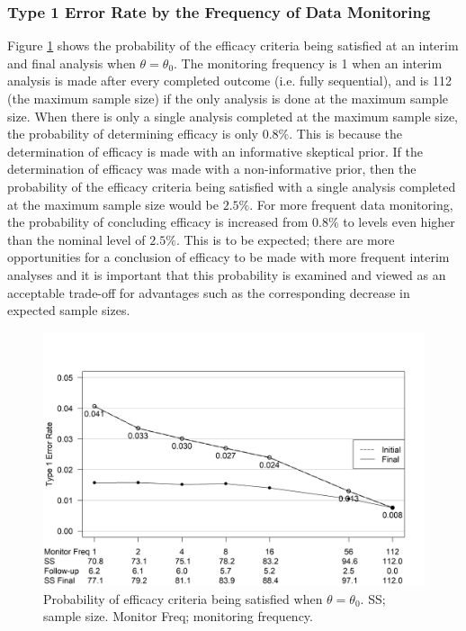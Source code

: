 \documentclass[useAMS,usenatbib,referee]{biom}
\begin{document}
\subsubsection{Type 1 Error Rate by the Frequency of Data Monitoring}\label{sec:ex1t1e}
Figure \ref{fig:ex1t1e} shows the probability of the efficacy criteria being satisfied at an interim and final analysis when $\theta=\theta_0$. 
%
The monitoring frequency is 1 when an interim analysis is made after every completed outcome (i.e. fully sequential), and is 112 (the maximum sample size) if the only analysis is done at the maximum sample size. When there is only a single analysis completed at the maximum sample size, the probability of determining efficacy is only $0.8\%$. This is because the determination of efficacy is made with an informative skeptical prior. If the determination of efficacy was made with a non-informative prior, then the probability of the efficacy criteria being satisfied with a single analysis completed at the maximum sample size would be $2.5\%$. For more frequent data monitoring, the probability of concluding efficacy is increased from $0.8\%$ to levels even higher than the nominal level of $2.5\%$. This is to be expected; there are more opportunities for a conclusion of efficacy to be made with more frequent interim analyses and it is important that this probability is examined and viewed as an acceptable trade-off for advantages such as the corresponding decrease in expected sample sizes.
\begin{figure}\begin{center}

    \includegraphics[width=6in]{figure4.png}
    \caption{Probability of efficacy criteria being satisfied when $\theta=\theta_0$. SS; sample size. Monitor Freq; monitoring frequency.}
	\label{fig:ex1t1e}

 
\end{center}
\end{figure}
\end{document}
